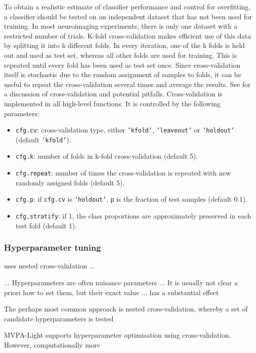 \documentclass[utf8]{frontiersSCNS} %
\newcommand{\ttt}[1]{\texttt{#1}}
\begin{document}
To obtain a realistic estimate of classifier performance and control for overfitting, a classifier should be tested on an independent dataset that has not been used for training. In most neuroimaging experiments, there is only one dataset with a restricted number of trials. K-fold cross-validation makes efficient use of this data by splitting it into k different folds. In every iteration, one of the k folds is held out and used as test set, whereas all other folds are used for training. This is repeated until every fold has been used as test set once. Since cross-validation itself is stochastic due to the random assignment of samples to folds, it can be useful to repeat the cross-validation several times and average the results. See \cite{Lemm2011} for a discussion of cross-validation and potential pitfalls. Cross-validation is implemented in all high-level functions. It is controlled by the following parameters:

\begin{itemize}
    \item \ttt{cfg.cv}: cross-validation type, either \ttt{'kfold'}, \ttt{'leaveout'} or \ttt{'holdout'} (default \ttt{'kfold'}).
    \item \ttt{cfg.k}: number of folds in k-fold cross-validation (default 5).
    \item \ttt{cfg.repeat}: number of times the cross-validation is repeated with new randomly assigned folds (default 5).
    \item \ttt{cfg.p}: if \ttt{cfg.cv} is \ttt{'holdout'}, \ttt{p} is the fraction of test samples (default 0.1).
    \item \ttt{cfg.stratify}: if 1, the class proportions are approximately preserved in each test fold (default 1).
\end{itemize}

\subsubsection{Hyperparameter tuning}

uses nested cross-validation ... 

...
Hyperparameters are often nuisance parameters ... It is usually not clear a priori how to set them, but their exact value ... has a substantial effect

The perhaps most common approach is nested cross-validation, whereby a set of candidate hyperparameters is tested

MVPA-Light supports hyperparameter optimisation using cross-validation. However, computationally more
\end{document}
